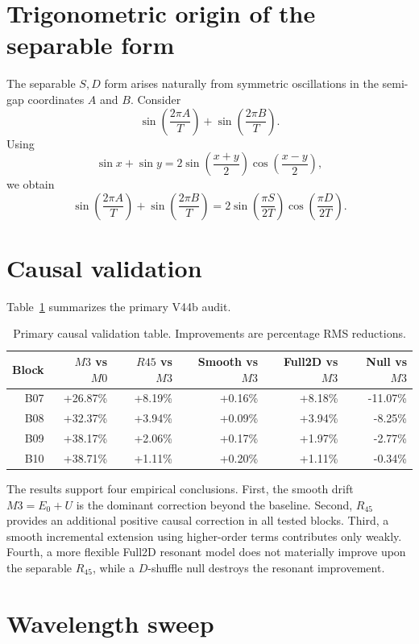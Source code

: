 \documentclass[11pt]{article}
\begin{document}
\section{Trigonometric origin of the separable form}

The separable \(S,D\) form arises naturally from symmetric oscillations in the semi-gap coordinates \(A\) and \(B\). Consider
\[
\sin\left(\frac{2\pi A}{T}\right)+\sin\left(\frac{2\pi B}{T}\right).
\]
Using
\[
\sin x+\sin y=2\sin\left(\frac{x+y}{2}\right)\cos\left(\frac{x-y}{2}\right),
\]
we obtain
\[
\sin\left(\frac{2\pi A}{T}\right)
+
\sin\left(\frac{2\pi B}{T}\right)
=
2
\sin\left(\frac{\pi S}{2T}\right)
\cos\left(\frac{\pi D}{2T}\right).
\]

\section{Causal validation}

Table~\ref{tab:v44b} summarizes the primary V44b audit.

\begin{table}[h]
\centering
\begin{tabular}{rrrrrr}
\toprule
Block & \(M3\) vs \(M0\) & \(R45\) vs \(M3\) & Smooth vs \(M3\) & Full2D vs \(M3\) & Null vs \(M3\)\\
\midrule
B07 & +26.87\% & +8.19\% & +0.16\% & +8.18\% & -11.07\%\\
B08 & +32.37\% & +3.94\% & +0.09\% & +3.94\% & -8.25\%\\
B09 & +38.17\% & +2.06\% & +0.17\% & +1.97\% & -2.77\%\\
B10 & +38.71\% & +1.11\% & +0.20\% & +1.11\% & -0.34\%\\
\bottomrule
\end{tabular}
\caption{Primary causal validation table. Improvements are percentage RMS reductions.}
\label{tab:v44b}
\end{table}

The results support four empirical conclusions. First, the smooth drift \(M3=E_0+U\) is the dominant correction beyond the baseline. Second, \(R_{45}\) provides an additional positive causal correction in all tested blocks. Third, a smooth incremental extension using higher-order terms contributes only weakly. Fourth, a more flexible Full2D resonant model does not materially improve upon the separable \(R_{45}\), while a \(D\)-shuffle null destroys the resonant improvement.

\section{Wavelength sweep}
\end{document}
